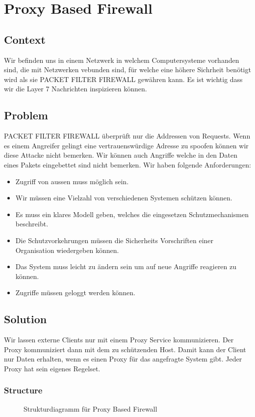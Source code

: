 \chapter{Proxy Based Firewall}

\section{Context}
Wir befinden uns in einem Netzwerk in welchem Computersysteme vorhanden sind, die mit Netzwerken vebunden sind, für welche eine höhere Sichrheit benötigt wird als sie PACKET FILTER FIREWALL gewähren kann. Es ist wichtig dass wir die Layer 7 Nachrichten inspizieren können.

\section{Problem}
PACKET FILTER FIREWALL überprüft nur die Addressen von Requests. Wenn es einem Angreifer gelingt eine vertrauenswürdige Adresse zu spoofen können wir diese Attacke nicht bemerken. Wir können auch Angriffe welche in den Daten eines Pakets eingebettet sind nicht bemerken. Wir haben folgende Anforderungen:

\begin{itemize}
  \item Zugriff von aussen muss möglich sein.
  \item Wir müssen eine Vielzahl von verschiedenen Systemen schützen können.
  \item Es muss ein klares Modell geben, welches die eingesetzen Schutzmechanismen beschreibt.
  \item Die Schutzvorkehrungen müssen die Sicherheits Vorschriften einer Organisation wiedergeben können.
  \item Das System muss leicht zu ändern sein um auf neue Angriffe reagieren zu können.
  \item Zugriffe müssen geloggt werden können.
\end{itemize}

\section{Solution}
Wir lassen externe Clients nur mit einem Prozy Service kommunizieren. Der Proxy kommuniziert dann mit dem zu schützenden Host. Damit kann der Client nur Daten erhalten, wenn es einen Proxy für das angefragte System gibt. Jeder Proxy hat sein eigenes Regelset.
\subsection{Structure}
\begin{figure}[H]
  \centering
  
  \caption{Strukturdiagramm f\"ur Proxy Based Firewall}
\end{figure}

